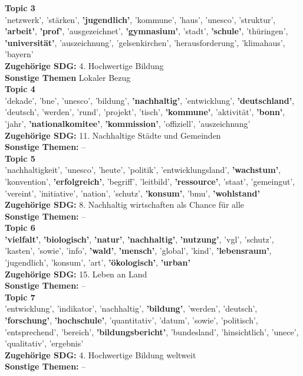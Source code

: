 \documentclass[letterpaper]{article}
\begin{document}
\textbf{Topic 3}  \\
'netzwerk', 'stärken', \textbf{'jugendlich'}, 'kommune', 'haus', 'unesco', 'struktur', \textbf{'arbeit'}, \textbf{'prof'}, 'ausgezeichnet', \textbf{'gymnasium'}, 'stadt', \textbf{'schule'}, 'thüringen', \textbf{'universität'}, 'auszeichnung', 'gelsenkirchen', 'herausforderung', 'klimahaus', 'bayern' \\
\textbf{Zugehörige SDG:} 4. Hochwertige Bildung\\
\textbf{Sonstige Themen} Lokaler Bezug\\
  
\textbf{Topic 4} \\
'dekade', 'bne', 'unesco', 'bildung', \textbf{'nachhaltig'}, 'entwicklung', \textbf{'deutschland'}, 'deutsch', 'werden', 'rund', 'projekt', 'tisch', \textbf{'kommune'}, 'aktivität', \textbf{'bonn'}, 'jahr', \textbf{'nationalkomitee'}, \textbf{'kommission'}, 'offiziell', 'auszeichnung'  \\
\textbf{Zugehörige SDG:} 11. Nachhaltige Städte und Gemeinden\\
\textbf{Sonstige Themen:} --\\
    
\textbf{Topic 5} \\
'nachhaltigkeit', 'unesco', 'heute', 'politik', 'entwicklungsland', \textbf{'wachstum'}, 'konvention', \textbf{'erfolgreich'}, 'begriff', 'leitbild', \textbf{'ressource'}, 'staat', 'gemeingut', 'vereint', 'initiative', 'nation', 'schutz', \textbf{'konsum'}, 'bmu', \textbf{'wohlstand'} \\
 \textbf{Zugehörige SDG:} 8. Nachhaltig wirtschaften als Chance für alle \\
 \textbf{Sonstige Themen:} --\\
 
\textbf{Topic 6} \\
\textbf{'vielfalt'}, \textbf{'biologisch'}, \textbf{'natur'}, \textbf{'nachhaltig'}, \textbf{'nutzung'}, 'vgl', 'schutz', 'kasten', 'sowie', 'info', \textbf{'wald'}, \textbf{'mensch'}, 'global', 'kind', \textbf{'lebensraum'}, 'jugendlich', 'konsum', 'art', \textbf{'ökologisch'}, \textbf{'urban'} \\
\textbf{Zugehörige SDG:} 15. Leben an Land \\
\textbf{Sonstige Themen:} --\\

\textbf{Topic 7} \\
'entwicklung', 'indikator', 'nachhaltig', \textbf{'bildung'}, 'werden', 'deutsch', \textbf{'forschung'}, \textbf{'hochschule'}, 'quantitativ', 'datum', 'sowie', 'politisch', 'entsprechend', 'bereich', \textbf{'bildungsbericht'}, 'bundesland', 'hinsichtlich', 'unece', 'qualitativ', 'ergebnis'  \\
\textbf{Zugehörige SDG:} 4. Hochwertige Bildung weltweit\\
\textbf{Sonstige Themen:} --\\
\end{document}
